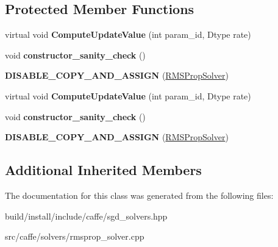\subsection*{Protected Member Functions}
\begin{DoxyCompactItemize}
\item 
\mbox{\label{classcaffe_1_1_r_m_s_prop_solver_a685e363f18013c1876cea226a006a668}} 
virtual void {\bfseries Compute\+Update\+Value} (int param\+\_\+id, Dtype rate)
\item 
\mbox{\label{classcaffe_1_1_r_m_s_prop_solver_af2ca9ae2da34564fa9f3cc6ab54ae78e}} 
void {\bfseries constructor\+\_\+sanity\+\_\+check} ()
\item 
\mbox{\label{classcaffe_1_1_r_m_s_prop_solver_ac262d365eb1113fcad19128205df18e8}} 
{\bfseries D\+I\+S\+A\+B\+L\+E\+\_\+\+C\+O\+P\+Y\+\_\+\+A\+N\+D\+\_\+\+A\+S\+S\+I\+GN} (\mbox{\hyperlink{classcaffe_1_1_r_m_s_prop_solver}{R\+M\+S\+Prop\+Solver}})
\item 
\mbox{\label{classcaffe_1_1_r_m_s_prop_solver_afc5fa716df2740af25ce65ba3fc17299}} 
virtual void {\bfseries Compute\+Update\+Value} (int param\+\_\+id, Dtype rate)
\item 
\mbox{\label{classcaffe_1_1_r_m_s_prop_solver_af2ca9ae2da34564fa9f3cc6ab54ae78e}} 
void {\bfseries constructor\+\_\+sanity\+\_\+check} ()
\item 
\mbox{\label{classcaffe_1_1_r_m_s_prop_solver_ac262d365eb1113fcad19128205df18e8}} 
{\bfseries D\+I\+S\+A\+B\+L\+E\+\_\+\+C\+O\+P\+Y\+\_\+\+A\+N\+D\+\_\+\+A\+S\+S\+I\+GN} (\mbox{\hyperlink{classcaffe_1_1_r_m_s_prop_solver}{R\+M\+S\+Prop\+Solver}})
\end{DoxyCompactItemize}
\subsection*{Additional Inherited Members}


The documentation for this class was generated from the following files\+:\begin{DoxyCompactItemize}
\item 
build/install/include/caffe/sgd\+\_\+solvers.\+hpp\item 
src/caffe/solvers/rmsprop\+\_\+solver.\+cpp\end{DoxyCompactItemize}
